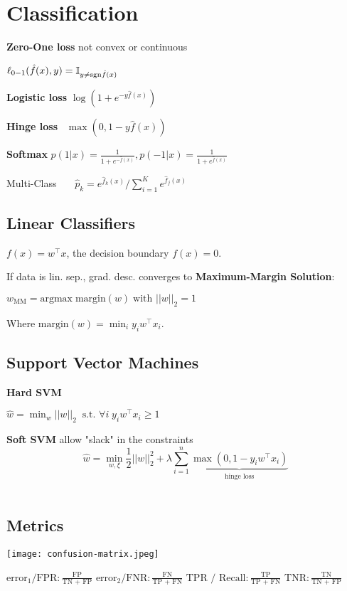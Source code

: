 \section*{Classification}

\textbf{Zero-One loss} \quad not convex or continuous

\qquad \qquad $\ell_{0-1}(\hat{f}(x), y) = \mathbb{I}_{y \neq \text{sgn} \hat{f}(x)}$

\textbf{Logistic loss} \quad $\log(1 + e^{-y \hat{f}(x)})$

\textbf{Hinge loss} \quad \ $\max(0, 1-y \hat{f}(x))$

\textbf{Softmax} $p(1 | x) = \frac{1}{1 + e^{- \hat{f}(x)}}, p(-1 | x) = \frac{1}{1 + e^{\hat{f}(x)}}$ 

Multi-Class \ \ \ $\hat{p}_k = e^{\hat{f}_k(x)} / \sum_{i=1}^K e^{\hat{f}_j(x)}$

\subsection*{Linear Classifiers}

$f(x) = w^\top x$, the decision boundary $f(x) = 0$. \smallskip

If data is lin. sep., grad. desc. converges to \textbf{Maximum-Margin Solution}: 

\quad $w_\text{MM} = \text{argmax} \; \text{margin} (w) \; \text{with } ||w||_2 = 1$

Where $\text{margin} (w) = \min_i y_i w^\top x_i$.
 
\subsection*{Support Vector Machines}
\textbf{Hard SVM}

\qquad $\hat{w} = \min_w ||w||_2 \; \; \text{s.t. } \forall i \;y_i w^\top x_i \geq 1$
 
\textbf{Soft SVM} \quad allow "slack" in the constraints
$$\hat{w} = \min_{w, \xi} \frac{1}{2} ||w||_2^2 + \lambda \sum_{i=1}^n \underbrace{\max (0, 1 - y_i w^\top x_i)}_{\text{hinge loss}}$$ \\[-23pt]

\subsection*{Metrics} 

\begin{multicols*}{2}
	\begin{center}
		\texttt{[image: confusion-matrix.jpeg]}
	\end{center}
	
	$\text{error}_1 / \text{FPR}: \frac{\text{FP}}{\text{TN + FP}}$
	$\text{error}_2 / \text{FNR}: \frac{\text{FN}}{\text{TP + FN}}$
	$\text{TPR / Recall}: \frac{\text{TP}}{\text{TP + FN}}$
	$\text{TNR}: \frac{\text{TN}}{\text{TN + FP}}$
\end{multicols*}

